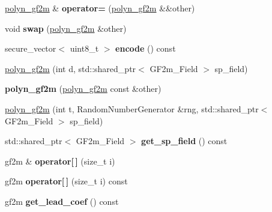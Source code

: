\begin{DoxyCompactItemize}
\mbox{\hyperlink{class_botan_1_1polyn__gf2m}{polyn\+\_\+gf2m}} \& {\bfseries operator=} (\mbox{\hyperlink{class_botan_1_1polyn__gf2m}{polyn\+\_\+gf2m}} \&\&other)
\item 
\mbox{\label{class_botan_1_1polyn__gf2m_a897c875b6a1326f4ab441b6f139693fb}} 
void {\bfseries swap} (\mbox{\hyperlink{class_botan_1_1polyn__gf2m}{polyn\+\_\+gf2m}} \&other)
\item 
\mbox{\label{class_botan_1_1polyn__gf2m_a0e0e8f4c11b87d8958ba587295fd1349}} 
secure\+\_\+vector$<$ uint8\+\_\+t $>$ {\bfseries encode} () const
\item 
\mbox{\hyperlink{class_botan_1_1polyn__gf2m_a689acdaa3af60106fac3c2ccb7edc0b7}{polyn\+\_\+gf2m}} (int d, std\+::shared\+\_\+ptr$<$ G\+F2m\+\_\+\+Field $>$ sp\+\_\+field)
\item 
\mbox{\label{class_botan_1_1polyn__gf2m_af6db5c639da9ef5db538030d9754295e}} 
{\bfseries polyn\+\_\+gf2m} (\mbox{\hyperlink{class_botan_1_1polyn__gf2m}{polyn\+\_\+gf2m}} const \&other)
\item 
\mbox{\hyperlink{class_botan_1_1polyn__gf2m_a249c5142d1c1ba263f863ed5f92ba319}{polyn\+\_\+gf2m}} (int t, Random\+Number\+Generator \&rng, std\+::shared\+\_\+ptr$<$ G\+F2m\+\_\+\+Field $>$ sp\+\_\+field)
\item 
\mbox{\label{class_botan_1_1polyn__gf2m_afa41c7e3878ef9bcab54625da96eeea1}} 
std\+::shared\+\_\+ptr$<$ G\+F2m\+\_\+\+Field $>$ {\bfseries get\+\_\+sp\+\_\+field} () const
\item 
\mbox{\label{class_botan_1_1polyn__gf2m_a19583ef1d75251eef28c5440f2fa1838}} 
gf2m \& {\bfseries operator\mbox{[}$\,$\mbox{]}} (size\+\_\+t i)
\item 
\mbox{\label{class_botan_1_1polyn__gf2m_ab1e3ce1cb593b6aaf8734a62535e6d0e}} 
gf2m {\bfseries operator\mbox{[}$\,$\mbox{]}} (size\+\_\+t i) const
\item 
\mbox{\label{class_botan_1_1polyn__gf2m_a6af8d0534545c51598f824d292aa9c1a}} 
gf2m {\bfseries get\+\_\+lead\+\_\+coef} () const
\item 

\end{DoxyCompactItemize}
